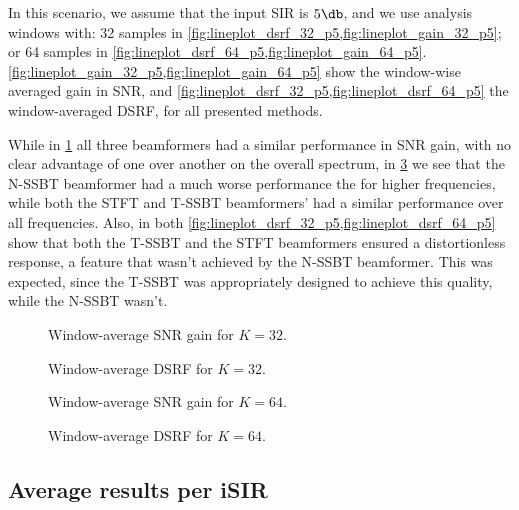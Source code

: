 In this scenario, we assume that the input SIR is $5\dB$, and we use analysis windows with: 32 samples in \cref{fig:lineplot_dsrf_32_p5,fig:lineplot_gain_32_p5}; or 64 samples in \cref{fig:lineplot_dsrf_64_p5,fig:lineplot_gain_64_p5}. \cref{fig:lineplot_gain_32_p5,fig:lineplot_gain_64_p5} show the window-wise averaged gain in SNR, and \cref{fig:lineplot_dsrf_32_p5,fig:lineplot_dsrf_64_p5} the window-averaged DSRF, for all presented methods.

While in \cref{fig:lineplot_gain_32_p5} all three beamformers had a similar performance in SNR gain, with no clear advantage of one over another on the overall spectrum, in \cref{fig:lineplot_gain_64_p5} we see that the N-SSBT beamformer had a much worse performance the for higher frequencies, while both the STFT and T-SSBT beamformers' had a similar performance over all frequencies. Also, in both \cref{fig:lineplot_dsrf_32_p5,fig:lineplot_dsrf_64_p5} show that both the T-SSBT and the STFT beamformers ensured a distortionless response, a feature that wasn't achieved by the N-SSBT beamformer. This was expected, since the T-SSBT was appropriately designed to achieve this quality, while the N-SSBT wasn't.


\begin{figure}[H]
\centering

\caption{Window-average SNR gain for $K = 32$.}
\label{fig:lineplot_gain_32_p5}
\end{figure}
\begin{figure}[H]
	\centering
	
	\caption{Window-average DSRF for $K = 32$.}
	\label{fig:lineplot_dsrf_32_p5}
\end{figure}


\begin{figure}[H]
\centering

\caption{Window-average SNR gain for $K = 64$.}
\label{fig:lineplot_gain_64_p5}
\end{figure}
\begin{figure}[H]
	\centering
	
	\caption{Window-average DSRF for $K = 64$.}
	\label{fig:lineplot_dsrf_64_p5}
\end{figure}

\subsection{Average results per iSIR}

